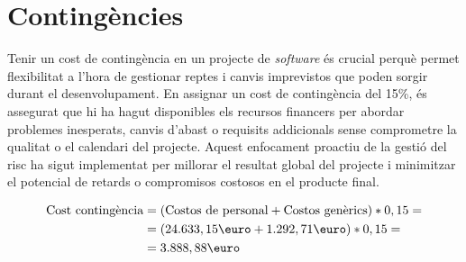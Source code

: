 \section{Contingències}
Tenir un cost de contingència en un projecte de \textit{software} és crucial perquè permet flexibilitat a l'hora de gestionar reptes i canvis imprevistos que poden sorgir durant el desenvolupament. En assignar un cost de contingència del 15\%, és assegurat que hi ha hagut disponibles els recursos financers per abordar problemes inesperats, canvis d'abast o requisits addicionals sense comprometre la qualitat o el calendari del projecte. Aquest enfocament proactiu de la gestió del risc ha sigut implementat per millorar el resultat global del projecte i minimitzar el potencial de retards o compromisos costosos en el producte final.


\begin{align*}
\text{Cost contingència} & = (\text{Costos de personal} + \text{Costos genèrics}) * 0,15 = \\
& = (24.633,15\text{\euro} + 1.292,71\text{\euro}) * 0,15 = \\
& =3.888,88\text{\euro}
\end{align*}

